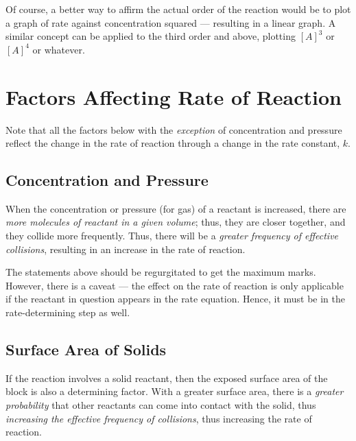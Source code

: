 				Of course, a better way to affirm the actual order of the reaction would be to plot a graph of rate against concentration
				squared --- resulting in a linear graph. A similar concept can be applied to the third order and above, plotting
				$[A]^{3}$ or $[A]^{4}$ or whatever.








	\section{Factors Affecting Rate of Reaction}

		Note that all the factors below with the \textit{exception} of concentration and pressure reflect the change in the rate of reaction
		through a change in the rate constant, $k$.

		\subsection{Concentration and Pressure}

			When the concentration or pressure (for gas) of a reactant is increased, there are \textit{more molecules of reactant
			in a given volume}; thus, they are closer together, and they collide more frequently. Thus, there will be a
			\textit{greater frequency of effective collisions}, resulting in an increase in the rate of reaction.

			The statements above should be regurgitated to get the maximum marks. However, there is a caveat --- the effect on the rate of
			reaction is only applicable if the reactant in question appears in the rate equation. Hence, it must be in the rate-determining
			step as well.


		\subsection{Surface Area of Solids}

			If the reaction involves a solid reactant, then the exposed surface area of the block is also a determining factor. With a
			greater surface area, there is a \textit{greater probability} that other reactants can come into contact with the solid, thus
			\textit{increasing the effective frequency of collisions}, thus increasing the rate of reaction.

